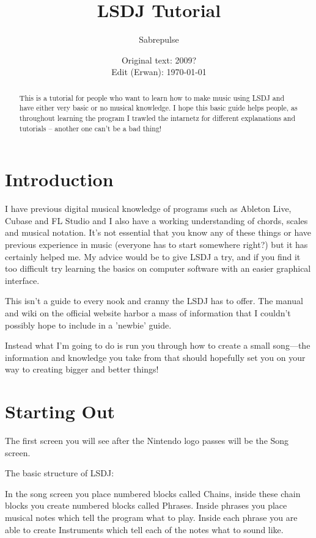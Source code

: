 \documentclass[]{article}
\title{LSDJ Tutorial}
\author{Sabrepulse}
\date{Original text: 2009? \\ Edit (Erwan): \today}
\begin{document}
\maketitle

\begin{abstract}
This is a tutorial for people who want to learn how to make music using LSDJ and have either very basic or no musical knowledge. I hope this basic guide helps people, as throughout learning the program I trawled the intarnetz for different explanations and tutorials – another one can’t be a bad thing!
\end{abstract}


\tableofcontents

\section{Introduction}



I have previous digital musical knowledge of programs such as Ableton Live, Cubase and FL Studio and I also have a working understanding of chords, scales and musical notation. It's not essential that you know any of these things or have previous experience in music (everyone has to start somewhere right?) but it has certainly helped me. My advice would be to give LSDJ a try, and if you find it too difficult try learning the basics on computer software with an easier graphical interface.

This isn't a guide to every nook and cranny the LSDJ has to offer. The manual and wiki on the official website harbor a mass of information that I couldn't possibly hope to include in a 'newbie' guide.

Instead what I'm going to do is run you through how to create a small song---the information and knowledge you take from that should hopefully set you on your way to creating bigger and better things!

\section{Starting Out}

The first screen you will see after the Nintendo logo passes will be the Song screen.

The basic structure of LSDJ:

In the song screen you place numbered blocks called Chains, inside these chain blocks you create numbered blocks called Phrases. Inside phrases you place musical notes which tell the program what to play. Inside each phrase you are able to create Instruments which tell each of the notes what to sound like.
\end{document}
